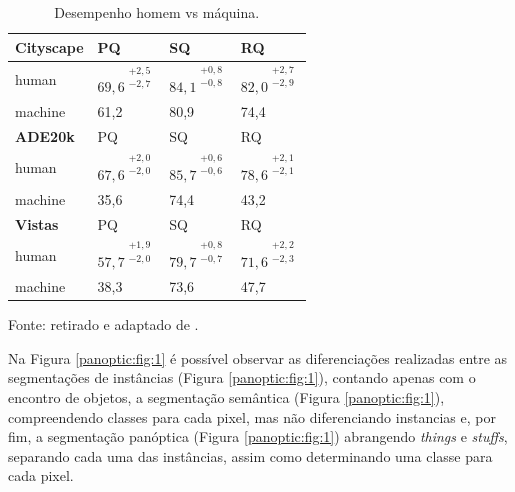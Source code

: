 \begin{table}[H]
    \centering
    \caption{Desempenho homem vs máquina.}
    \label{panoptic:table:1}
    \begin{tabular}{@{}l|lll@{}}
    \textbf{Cityscape} & PQ   & SQ   & RQ   \\ \hline
    human              & $69,6^{\substack{+2,5\\-2,7}}$ & $84,1^{\substack{+0,8\\-0,8}}$ &  $82,0^{\substack{+2,7\\-2,9}}$ \\
    machine            & 61,2 & 80,9 & 74,4 \vspace*{0,3cm}\\
    \textbf{ADE20k}    & PQ   & SQ   & RQ   \\ \hline
    human              & $67,6^{\substack{+2,0\\-2,0}}$ & $85,7^{\substack{+0,6\\-0,6}}$ & $78,6^{\substack{+2,1\\-2,1}}$ \\
    machine            & 35,6 & 74,4 & 43,2 \vspace*{0,3cm}\\
    \textbf{Vistas}    & PQ   & SQ   & RQ   \\ \hline
    human              & $57,7^{\substack{+1,9\\-2,0}}$ & $79,7^{\substack{+0,8\\-0,7}}$ & $71,6^{\substack{+2,2\\-2,3}}$ \\
    machine            & 38,3 & 73,6 & 47,7
    \end{tabular}

    \vspace*{1 cm}
    Fonte: retirado e adaptado de \cite{Kirillov2019a}.
\end{table}

Na Figura \ref{panoptic:fig:1} é possível observar as diferenciações realizadas entre as segmentações de instâncias (Figura \ref{panoptic:fig:1}), contando apenas com o encontro de objetos, a segmentação semântica (Figura \ref{panoptic:fig:1}), compreendendo classes para cada pixel, mas não diferenciando instancias e, por fim, a segmentação panóptica (Figura \ref{panoptic:fig:1}) abrangendo \textit{things} e \textit{stuffs}, separando cada uma das instâncias, assim como determinando uma classe para cada pixel.

